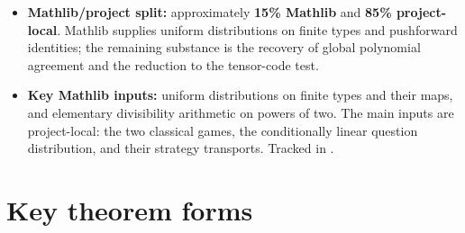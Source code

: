 \documentclass[11pt]{article}
\begin{document}
\begin{itemize}
  absorption. The strategy construction, distributional matching, branch-weight
  bound, and auxiliary parameter inequalities are now formalized. The padding fallback is heavier,
  roughly 6--10 reworked lemmas.
  \item \textbf{Mathlib/project split:} approximately \textbf{15\% Mathlib}
  and \textbf{85\% project-local}.  Mathlib supplies uniform distributions on
  finite types and pushforward identities; the remaining substance is the
  recovery of global polynomial agreement and the reduction to the tensor-code test.
  \item \textbf{Key Mathlib inputs:} uniform distributions on finite types
  and their maps, and elementary divisibility arithmetic on powers of two.
  The main inputs are project-local: the two classical games, the
  conditionally linear question distribution, and their strategy transports.
  Tracked in .
\end{itemize}

\section{Key theorem forms}
\end{document}
